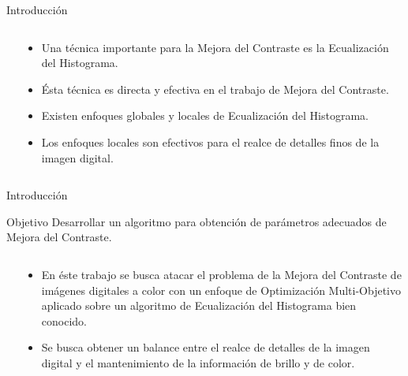 \documentclass[usenames,dvipsnames]{beamer}
\begin{document}
\begin{frame}{Introducción}

\begin{columns}[t]
\begin{column}{.3\textwidth}

\end{column}
\begin{column}{.7\textwidth}
\begin{itemize}
	\item Una técnica importante para la Mejora del Contraste es la Ecualización del Histograma.
	\item Ésta técnica es directa y efectiva en el trabajo de Mejora del Contraste.
	\item Existen enfoques globales y locales de Ecualización del Histograma.
	\item Los enfoques locales son efectivos para el realce de detalles finos de la imagen digital.
\end{itemize}
\end{column}
\end{columns}


\end{frame}


\begin{frame}{Introducción}
\vspace{-0.5cm}
\begin{alertblock}{Objetivo}
Desarrollar un algoritmo para obtención de parámetros adecuados de Mejora del Contraste.
\end{alertblock}
\vspace{-0.2cm}
\begin{columns}[t]
\begin{column}{.3\textwidth}

\end{column}
\begin{column}{.7\textwidth}
\begin{itemize}
	\item En éste trabajo se busca atacar el problema de la Mejora del Contraste de imágenes digitales a color con un enfoque de Optimización Multi-Objetivo aplicado sobre un algoritmo de Ecualización del Histograma bien conocido.
	\item Se busca obtener un balance entre el realce de detalles de la imagen digital y el mantenimiento de la información de brillo y de color.
\end{itemize}
\end{column}
\end{columns}


\end{frame}
\end{document}
